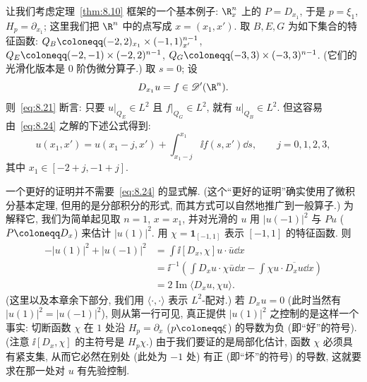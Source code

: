 让我们考虑定理~\ref{thm:8.10} 框架的一个基本例子: $\R^n_x$ 上的 $P = D_{x_1}$, 于是 $p = \xi_1$, $H_p = \partial_{x_1}$; 这里我们把 $\R^n$ 中的点写成 $x = (x_1, x')$. 取 $B, E, G$ 为如下集合的特征函数: $Q_B \defeq (-2, 2)_{x_1} \times (-1, 1)^{n-1}_{x'}$, $Q_E \defeq (-2, -1) \times (-2, 2)^{n-1}$, $Q_G \defeq (-3, 3) \times (-3, 3)^{n-1}$. (它们的光滑化版本是 $0$ 阶伪微分算子.) 取 $s = 0$; 设
\begin{equation}\label{eq:8.24}
    D_{x_1}u = f \in \Distr(\R^n).
\end{equation}
则~\eqref{eq:8.21} 断言: 只要 $u|_{Q_E} \in L^2$ 且 $f|_{Q_G} \in L^2$, 就有 $u|_{Q_B} \in L^2$. 但这容易由~\eqref{eq:8.24} 之解的下述公式得到:
\begin{equation*}
    u(x_1, x') = u(x_1 - j, x') + \int_{x_1 - j}^{x_1} \ii f(s, x') \dd s, \qquad j = 0, 1, 2, 3,
\end{equation*}
其中 $x_1 \in [-2 + j, -1 + j]$.

一个更好的证明并不需要~\eqref{eq:8.24} 的显式解. (这个``更好的证明''确实使用了微积分基本定理, 但用的是分部积分的形式, 而其方式可以自然地推广到一般算子.) 为解释它, 我们为简单起见取 $n = 1$, $x = x_1$, 并对光滑的 $u$ 用 $|u(-1)|^2$ 与 $Pu$ ($P \defeq D_x$) 来估计 $|u(1)|^2$. 用 $\chi = \mathbf{1}_{[-1, 1]}$ 表示 $[-1, 1]$ 的特征函数. 则
\begin{equation}\label{eq:8.25}
    \begin{aligned}
        -| u(1) |^2 + | u(-1) |^2 &= \int \ii [D_x, \chi]u \cdot \bar{u} \dd x \\
        &= \ii^{-1} \left( \int D_x u \cdot \chi \bar{u} \dd x - \int \chi u \cdot \overline{D_x u} \dd x \right) \\
        &= 2 \operatorname{Im} \langle D_x u, \chi u \rangle.
    \end{aligned}
\end{equation}
(这里以及本章余下部分, 我们用 $\langle \cdot, \cdot \rangle$ 表示 $L^2$-配对.) 若 $D_x u = 0$ (此时当然有 $|u(1)|^2 = |u(-1)|^2$), 则从第一行可见, 真正提供 $|u(1)|^2$ 之控制的是这样一个事实: 切断函数 $\chi$ 在 $1$ 处沿 $H_p = \partial_x$ ($p \defeq \xi$) 的导数为负 (即``好''的符号). (注意 $\ii[D_x, \chi]$ 的主符号是 $H_p\chi$.) 由于我们要证的是局部化估计, 函数 $\chi$ 必须具有紧支集, 从而它必然在别处 (此处为 $-1$ 处) 有正 (即``坏''的符号) 的导数, 这就要求在那一处对 $u$ 有先验控制.


